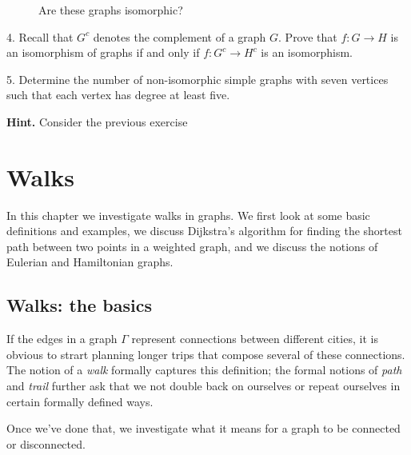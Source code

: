 \documentclass[10pt,]{book}
\theoremstyle{plain}
\theoremstyle{definition}
\theoremstyle{definition}
\theoremstyle{definition}
\theoremstyle{definition}
\numberwithin{equation}{section}
\begin{document}
\begin{exerciselist}
\begin{figure}
\caption{Are these graphs isomorphic?\label{isomorphic_exercise}}
\end{figure}
\par\smallskip
\item[4.]\hypertarget{exercise-6}{}\hypertarget{p-81}{}%
Recall that \(G^c\) denotes the complement of a graph \(G\).  Prove that \(f:G\to H\) is an isomorphism of graphs if and only if \(f:G^c\to H^c\) is an isomorphism.%
\par\smallskip
\item[5.]\hypertarget{exercise-7}{}\hypertarget{p-82}{}%
Determine the number of non-isomorphic simple graphs with seven vertices such that each vertex has degree at least five.%
\par\smallskip
\par\smallskip%
\noindent\textbf{Hint.}\hypertarget{hint-1}{}\quad%
\hypertarget{p-83}{}%
Consider the previous exercise%
\end{exerciselist}
\typeout{************************************************}
\typeout{************************************************}
\chapter[{Walks}]{Walks}\label{ch_walks}
\hypertarget{p-84}{}%
In this chapter we investigate walks in graphs.  We first look at some basic definitions and examples, we discuss Dijkstra's algorithm for finding the shortest path between two points in a weighted graph, and we discuss the notions of Eulerian and Hamiltonian graphs.%
\typeout{************************************************}
\typeout{************************************************}
\section[{Walks: the basics}]{Walks: the basics}\label{s_walks_basics}
\hypertarget{p-85}{}%
If the edges in a graph \(\Gamma\) represent connections between different cities, it is obvious to strart planning longer trips that compose several of these connections.  The notion of a \emph{walk} formally captures this definition; the formal notions of \emph{path} and \emph{trail} further ask that we not double back on ourselves or repeat ourselves in certain formally defined ways.%
 \par
\hypertarget{p-86}{}%
Once we've done that, we investigate what it means for a graph to be connected or disconnected.%
\typeout{************************************************}
\typeout{************************************************}
\end{document}
